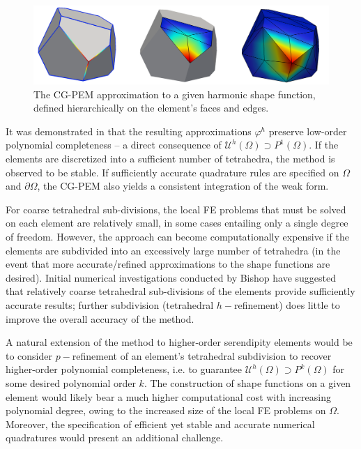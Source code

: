 \begin{figure} [!ht]
	\centering
	\includegraphics[width = 6.0in]{figures/harmonic_fem_sfs.pdf}
	\caption{The CG-PEM approximation to a given harmonic shape function, defined hierarchically on the element's faces and edges.}
	\label{fig:harmonic_fem_sfs}
\end{figure}
	
	It was demonstrated in \cite{Bishop:14} that the resulting approximations $\varphi^h$ preserve low-order polynomial completeness -- a direct consequence of $\mathcal{U}^h (\Omega) \supset P^1 (\Omega)$. If the elements are discretized into a sufficient number of tetrahedra, the method is observed to be stable. If sufficiently accurate quadrature rules are specified on $\Omega$ and $\partial \Omega$, the CG-PEM also yields a consistent integration of the weak form.
	
	For coarse tetrahedral sub-divisions, the local FE problems that must be solved on each element are relatively small, in some cases entailing only a single degree of freedom. However, the approach can become computationally expensive if the elements are subdivided into an excessively large number of tetrahedra (in the event that more accurate/refined approximations to the shape functions are desired). Initial numerical investigations conducted by Bishop have suggested that relatively coarse tetrahedral sub-divisions of the elements provide sufficiently accurate results; further subdivision (tetrahedral $h-$refinement) does little to improve the overall accuracy of the method.
	
	A natural extension of the method to higher-order serendipity elements would be to consider $p-$refinement of an element's tetrahedral subdivision to recover higher-order polynomial completeness, i.e. to guarantee $\mathcal{U}^h (\Omega) \supset P^k (\Omega)$ for some desired polynomial order $k$. The construction of shape functions on a given element would likely bear a much higher computational cost with increasing polynomial degree, owing to the increased size of the local FE problems on $\Omega$. Moreover, the specification of efficient yet stable and accurate numerical quadratures would present an additional challenge.
	
